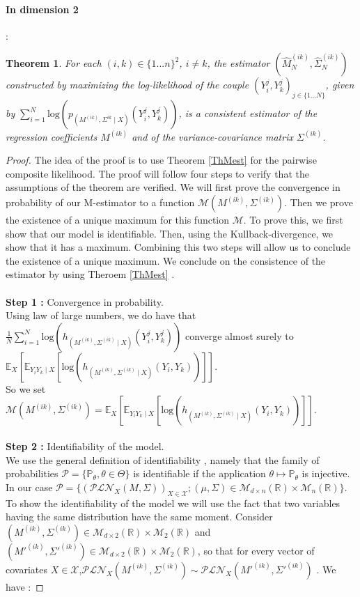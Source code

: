 \documentclass[11pt, a4paper]{article}
\newtheorem{theorem}{Theorem}
\begin{document}
\paragraph{In dimension 2} :
\begin{theorem} \label{Consistence_2}
For each $(i,k) \in \{1...n\}^2$, $i \neq k$, the estimator $(\widehat{M}^{(ik)}_N,\widehat{\Sigma}^{(ik)}_N)$ constructed by maximizing the log-likelihood of the couple $(Y^j_i,Y^j_k)_{j \in \{1...N\}}$, given by $\sum_{i=1}^{N} \mathrm{log}(p_{(M^{(ik)},\Sigma^{ik} \mid X)}(Y^j_i,Y^j_k))$, is a consistent estimator of the regression coefficients $M^{(ik)}$ and of the variance-covariance matrix $\Sigma^{(ik)}$.
\end{theorem}
\begin{proof}

The idea of the proof is to use Theorem \ref{ThMest} for the pairwise composite likelihood. The proof will  follow four steps to verify that the assumptions of the theorem are verified. We will first prove the convergence in probability of our M-estimator to a function $\mathcal{M}{(M^{(ik)},\Sigma^{(ik)})}$. Then we prove the existence of a unique maximum for this function $\mathcal{M}$. To prove this, we  first  show that our model is identifiable. Then, using the Kullback-divergence, we show that it has a  maximum. Combining this two steps will allow us to conclude the existence of a unique maximum. We conclude on the consistence of the estimator by using Theroem \ref{ThMest} . \\
\\
\textbf{Step 1 :} Convergence in probability.\\
Using law of large numbers, we do have that $\frac{1}{N} \sum_{i=1}^{N} \mathrm{log}(h_{(M^{(ik)},\Sigma^{(ik)} \mid X)}(Y^j_i,Y^j_k))$ converge almost surely to $\mathbb{E}_X[\mathbb{E}_{Y_i Y_k \mid X}[ \mathrm{log}(h_{(M^{(ik)},\Sigma^{(ik)} \mid X)}(Y_i,Y_k))]]$.\\
 So we set $\mathcal{M}(M^{(ik)}, \Sigma^{(ik)}) =\mathbb{E}_X[\mathbb{E}_{Y_i Y_k \mid X}[ \mathrm{log}(h_{(M^{(ik)},\Sigma^{(ik)} \mid X)}(Y_i,Y_k))]]$. \\
\\
\textbf{Step 2 :} Identifiability of the model.\\
 We use the general definition of identifiability \cite{rivoirard}, namely that the family of probabilities $\mathcal{P}=\{\mathbb{P}_\theta,\theta \in \Theta\}$ is identifiable if the application $ \theta \mapsto \mathbb{P}_\theta$ is injective.
 In our case $\mathcal{P}=\{(\mathcal{PLN}_X (M,\Sigma))_{X \in \mathcal{X}}; (\mu, \Sigma) \in  \mathcal{M}_{d \times n}(\mathbb{R}) \times \mathcal{M}_n(\mathbb{R})\}$. To show the identifiability of the model we will use the fact that two variables having the same distribution have the same moment. Consider $(M^{(ik)},\Sigma^{(ik)}) \in \mathcal{M}_{d\times 2}(\mathbb{R}) \times \mathcal{M}_2(\mathbb{R})$ and $(M'^{(ik)},\Sigma'^{(ik)}) \in \mathcal{M}_{d\times 2}(\mathbb{R}) \times \mathcal{M}_2(\mathbb{R})$, so that  for every vector of covariates $X \in \mathcal{X}$,$\mathcal{PLN}_X(M^{(ik)},\Sigma^{(ik)})\sim\mathcal{PLN}_X(M'^{(ik)},\Sigma'^{(ik)})$ . We have :

\end{proof}
\end{document}
